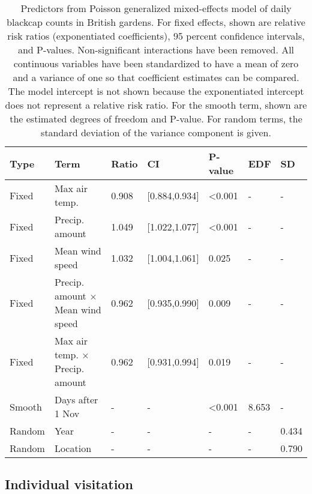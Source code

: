 \documentclass[a4paper, nobind]{templates/ociamthesis}
\begin{document}
\begin{table}[!h]

\caption{\label{tab:daily-model-table}Predictors from Poisson generalized mixed-effects model of daily blackcap counts in British gardens. For fixed effects, shown are relative risk ratios (exponentiated coefficients), 95 percent confidence intervals, and P-values. Non-significant interactions have been removed. All continuous variables have been standardized to have a mean of zero and a variance of one so that coefficient estimates can be compared. The model intercept is not shown because the exponentiated intercept does not represent a relative risk ratio. For the smooth term, shown are the estimated degrees of freedom and P-value. For random terms, the standard deviation of the variance component is given.}
\centering
\fontsize{9.5}{11.5}\selectfont
\begin{tabular}{l|>{\raggedright\arraybackslash}p{9em}|l|l|l|l|l}
\hline
Type & Term & Ratio & CI & P-value & EDF & SD\\
\hline
Fixed & Max air temp. & 0.908 & [0.884,0.934] & <0.001 & - & -\\
\hline
Fixed & Precip. amount & 1.049 & [1.022,1.077] & <0.001 & - & -\\
\hline
Fixed & Mean wind speed & 1.032 & [1.004,1.061] & 0.025 & - & -\\
\hline
Fixed & Precip. amount $\times$ Mean wind speed & 0.962 & [0.935,0.990] & 0.009 & - & -\\
\hline
Fixed & Max air temp. $\times$ Precip. amount & 0.962 & [0.931,0.994] & 0.019 & - & -\\
\hline
Smooth & Days after 1 Nov & - & - & <0.001 & 8.653 & -\\
\hline
Random & Year & - & - & - & - & 0.434\\
\hline
Random & Location & - & - & - & - & 0.790\\
\hline
\end{tabular}
\end{table}

\hypertarget{individual-visitation-1}{%
\subsection{Individual visitation}\label{individual-visitation-1}}
\end{document}
